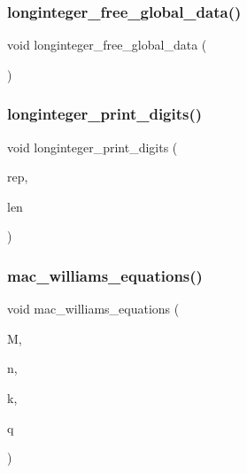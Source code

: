 \subsubsection{\texorpdfstring{longinteger\+\_\+free\+\_\+global\+\_\+data()}{longinteger\_free\_global\_data()}}
{\footnotesize\ttfamily void longinteger\+\_\+free\+\_\+global\+\_\+data (\begin{DoxyParamCaption}{ }\end{DoxyParamCaption})}

\mbox{\label{longinteger__domain_8_c_ac2bac7b12f5b6440b8dad275cd7a157d}} 
\subsubsection{\texorpdfstring{longinteger\+\_\+print\+\_\+digits()}{longinteger\_print\_digits()}}
{\footnotesize\ttfamily void longinteger\+\_\+print\+\_\+digits (\begin{DoxyParamCaption}\item[{\mbox{\hyperlink{galois_8h_ab6cc7b4aeb6ea31aba2b3fbfc83ff5e6}{B\+Y\+TE}} $\ast$}]{rep,  }\item[{\mbox{\hyperlink{galois_8h_a09fddde158a3a20bd2dcadb609de11dc}{I\+NT}}}]{len }\end{DoxyParamCaption})}

\mbox{\label{longinteger__domain_8_c_ab961335354336870064bacc0a101eab6}} 
\subsubsection{\texorpdfstring{mac\+\_\+williams\+\_\+equations()}{mac\_williams\_equations()}}
{\footnotesize\ttfamily void mac\+\_\+williams\+\_\+equations (\begin{DoxyParamCaption}\item[{\mbox{\hyperlink{classlonginteger__object}{longinteger\+\_\+object}} $\ast$\&}]{M,  }\item[{\mbox{\hyperlink{galois_8h_a09fddde158a3a20bd2dcadb609de11dc}{I\+NT}}}]{n,  }\item[{\mbox{\hyperlink{galois_8h_a09fddde158a3a20bd2dcadb609de11dc}{I\+NT}}}]{k,  }\item[{\mbox{\hyperlink{galois_8h_a09fddde158a3a20bd2dcadb609de11dc}{I\+NT}}}]{q }\end{DoxyParamCaption})}

